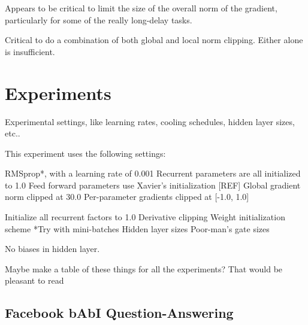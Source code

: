 \documentclass{article}
\begin{document}
Appears to be critical to limit the size of the overall norm of the gradient, particularly for some of the really long-delay tasks.

Critical to do a combination of both global and local norm clipping. Either alone is insufficient.

\section{Experiments}
\label{others}
Experimental settings, like learning rates, cooling schedules, hidden layer sizes, etc..


This experiment uses the following settings:

RMSprop*, with a learning rate of 0.001
Recurrent parameters are all initialized to 1.0
Feed forward parameters use Xavier’s initialization [REF]
Global gradient norm clipped at 30.0
Per-parameter gradients clipped at [-1.0, 1.0]

Initialize all recurrent factors to 1.0
Derivative clipping
Weight initialization scheme
*Try with mini-batches
Hidden layer sizes
Poor-man’s gate sizes

No biases in hidden layer.

Maybe make a table of these things for all the experiments? That would be pleasant to read

\subsection{Facebook bAbI Question-Answering}
\end{document}
